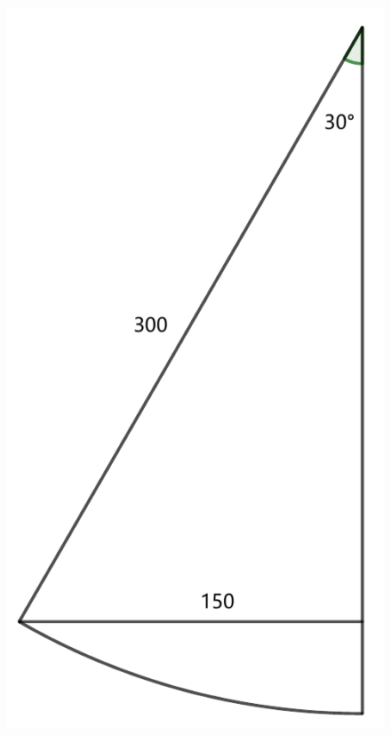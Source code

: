 \documentclass[withoutpreface,bwprint]{cumcmthesis} %
\begin{document}
\begin{figure}[!h]
    \centering
    \begin{minipage}[c]{0.48\textwidth}
        \centering
        \includegraphics[height=0.2\textheight]{angle1.pdf}
    \end{minipage}
    \begin{minipage}[c]{0.48\textwidth}
        \centering

\end{minipage}
\end{figure}
\end{document}
